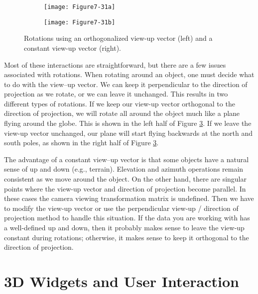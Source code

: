 \begin{figure}[!htb]
	\centering
	\begin{subfigure}{0.48\linewidth}
		\centering
		\texttt{[image: Figure7-31a]}
		\caption*{}\label{fig:Figure7-31a}
	\end{subfigure}
	\hfill
	\begin{subfigure}{0.48\linewidth}
		\centering
		\texttt{[image: Figure7-31b]}
		\caption*{}\label{fig:Figure7-31b}
	\end{subfigure}%
	\caption{Rotations using an orthogonalized view-up vector (left) and a constant view-up vector (right).}
	\label{fig:Figure7-31}
\end{figure}

Most of these interactions are straightforward, but there are a few issues associated with rotations. When rotating around an object, one must decide what to do with the view--up vector. We can keep it perpendicular to the direction of projection as we rotate, or we can leave it unchanged. This results in two different types of rotations. If we keep our view-up vector orthogonal to the direction of projection, we will rotate all around the object much like a plane flying around the globe. This is shown in the left half of Figure \ref{fig:Figure7-31}. If we leave the view-up vector unchanged, our plane will start flying backwards at the north and south poles, as shown in the right half of Figure \ref{fig:Figure7-31}.

The advantage of a constant view--up vector is that some objects have a natural sense of up and down (e.g., terrain). Elevation and azimuth operations remain consistent as we move around the object. On the other hand, there are singular points where the view-up vector and direction of projection become parallel. In these cases the camera viewing transformation matrix is undefined. Then we have to modify the view-up vector or use the perpendicular view-up / direction of projection method to handle this situation. If the data you are working with has a well-defined up and down, then it probably makes sense to leave the view-up constant during rotations; otherwise, it makes sense to keep it orthogonal to the direction of projection.

\section{3D Widgets and User Interaction}
\label{sec:3D_widgets_user_interaction}

